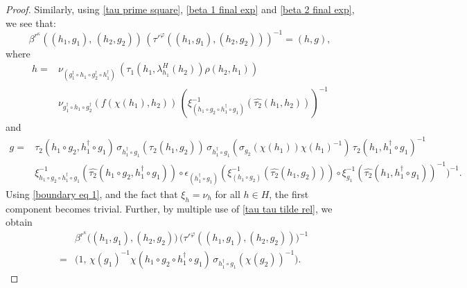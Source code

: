 \documentclass{jonasart}
\theoremstyle{plain}
\begin{document}
\begin{proof}
		Similarly, using \eqref{tau prime square}, \eqref{beta 1 final exp} and \eqref{beta 2 final exp}, we see that:
		\[
		\beta^{r^\kappa}\left( (h_1,g_1), \, (h_2,g_2) \right) \, \left(\tau'^\varphi((h_1,g_1), (h_2,g_2))\right)^{-1} = (h, g),
		\]
		where
		\begin{align*}
			h = { }&{ }\nu_{(g_1^\dagger\circ h_1\circ g_2^\dagger\circ h_1^\dagger)} \, (\tau_1(h_1,\lambda^H_{h_1}(h_2)) \rho(h_2,h_1)) \\&{ }\nu_{g_1^{\dagger} \circ h_1 \circ g_2^{\dagger}}(f(\chi(h_1),h_2)) \, \left(\xi^{-1}_{(h_1\circ g_2\circ h_1^\dagger\circ g_1)} (\hat{\tau_2}(h_1,h_2))\right)^{-1}
		\end{align*}
		and
		\begin{align*}
			g = { }&{ } \tau_2(h_1\circ g_2, h_1^{\dagger}\circ g_1) \, \sigma_{h_1^{\dagger}\circ g_1}(\tau_2(h_1,g_2)) \, \sigma_{h_1^{\dagger}\circ g_1}(\sigma_{g_2} (\chi(h_1)) \chi(h_1)^{-1}) \,  \tau_2(h_1,h_1^{\dagger}\circ g_1)^{-1} \\
			& \xi^{-1}_{h_1\circ g_2\circ h_1^\dagger\circ g_1} (\hat{\tau_2}(h_1\circ g_2,h_1^\dagger \circ g_1))\circ \epsilon_{(h_1^\dagger\circ g_1 )}(\xi^{-1}_{(h_1\circ g_2)}(\hat{\tau_2}(h_1,g_2)))\circ \xi^{-1}_{g_1}(\hat{\tau_2}(h_1,h_1^\dagger\circ g_1))^{-1}\big)^{-1}\!.
		\end{align*}
		Using \eqref{boundary eq 1},  and the fact that $\xi_h=\nu_h$ for all $h\in H$, the first component becomes trivial. Further, by multiple use of \eqref{tau tau tilde rel}, we obtain
		\begin{eqnarray}
			&&	\beta^{r^\kappa} \big((h_1,g_1),(h_2,g_2) \big)\,  \big(\tau'^\varphi((h_1,g_1),(h_2,g_2)) \big)^{-1} \nonumber\\
			&=&  \big(1,\, \chi(g_1)^{-1}\chi(h_1\circ g_2\circ h_1^{\dagger}\circ g_1) \, \sigma_{h_1^{\dagger}\circ g_1}(\chi(g_2))^{-1}  \big). \label{tau 1 prime tau 2 prime inverse 2}
		\end{eqnarray}
		

\end{proof}
\end{document}
